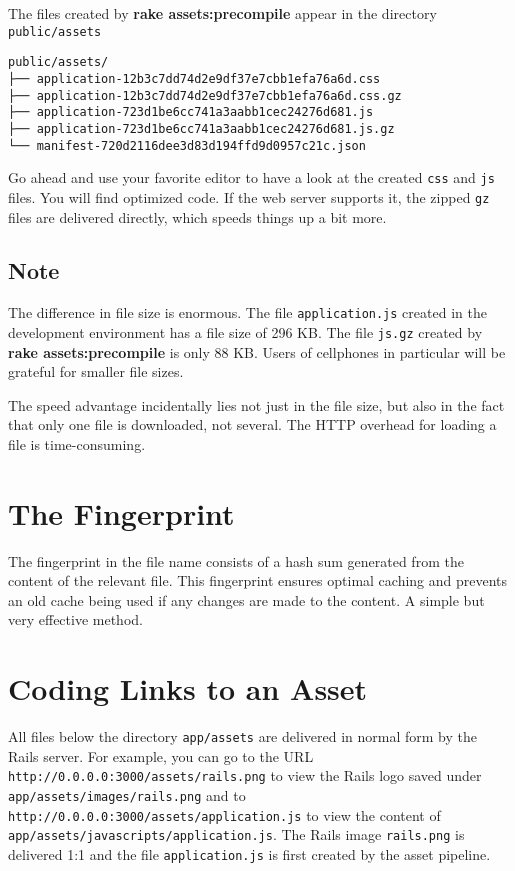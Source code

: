 \documentclass[a4paper]{book}
\begin{document}
The files created by \textbf{rake assets:precompile} appear in the directory \texttt{public/assets}

\begin{shaded}\begin{verbatim}
public/assets/
├── application-12b3c7dd74d2e9df37e7cbb1efa76a6d.css
├── application-12b3c7dd74d2e9df37e7cbb1efa76a6d.css.gz
├── application-723d1be6cc741a3aabb1cec24276d681.js
├── application-723d1be6cc741a3aabb1cec24276d681.js.gz
└── manifest-720d2116dee3d83d194ffd9d0957c21c.json
\end{verbatim}\end{shaded}

Go ahead and use your favorite editor to have a look at the created \texttt{css} and \texttt{js} files. You will find optimized code. If the web server supports it, the zipped \texttt{gz} files are delivered directly, which speeds things up a bit more.

\subsection{Note}\label{note-51}

The difference in file size is enormous. The file \texttt{application.js} created in the development environment has a file size of 296 KB. The file \texttt{js.gz} created by \textbf{rake assets:precompile} is only 88 KB. Users of cellphones in particular will be grateful for smaller file sizes.

The speed advantage incidentally lies not just in the file size, but also in the fact that only one file is downloaded, not several. The HTTP overhead for loading a file is time-consuming.

\section{The Fingerprint}\label{the-fingerprint}

The fingerprint in the file name consists of a hash sum generated from the content of the relevant file. This fingerprint ensures optimal caching and prevents an old cache being used if any changes are made to the content. A simple but very effective method.

\section{Coding Links to an Asset}\label{coding-links-to-an-asset}

All files below the directory \texttt{app/assets} are delivered in normal form by the Rails server. For example, you can go to the URL \texttt{http://0.0.0.0:3000/assets/rails.png} to view the Rails logo saved under \texttt{app/assets/images/rails.png} and to \texttt{http://0.0.0.0:3000/assets/application.js} to view the content of \texttt{app/assets/javascripts/application.js}. The Rails image \texttt{rails.png} is delivered 1:1 and the file \texttt{application.js} is first created by the asset pipeline.
\end{document}
